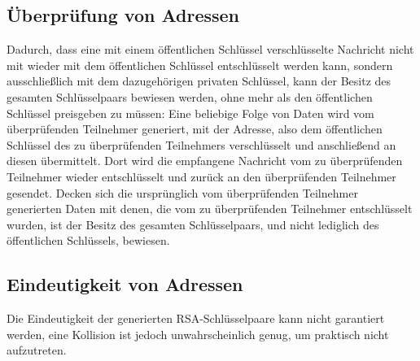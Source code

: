 \subsection{Überprüfung von Adressen}
Dadurch, dass eine mit einem öffentlichen Schlüssel verschlüsselte Nachricht nicht mit wieder mit dem
öffentlichen Schlüssel entschlüsselt werden kann, sondern ausschließlich mit dem dazugehörigen privaten
Schlüssel, kann der Besitz des gesamten Schlüsselpaars bewiesen werden, ohne mehr als den öffentlichen
Schlüssel preisgeben zu müssen: Eine beliebige Folge von Daten wird vom überprüfenden Teilnehmer
generiert, mit der Adresse, also dem öffentlichen Schlüssel des zu überprüfenden Teilnehmers
verschlüsselt und anschließend an diesen übermittelt. Dort wird die empfangene Nachricht vom zu
überprüfenden Teilnehmer wieder entschlüsselt und zurück an den überprüfenden Teilnehmer gesendet.
Decken sich die ursprünglich vom überprüfenden Teilnehmer generierten Daten mit denen, die vom zu
überprüfenden Teilnehmer entschlüsselt wurden, ist der Besitz des gesamten Schlüsselpaars, und nicht
lediglich des öffentlichen Schlüssels, bewiesen.



\subsection{Eindeutigkeit von Adressen}
Die Eindeutigkeit der generierten RSA-Schlüsselpaare kann nicht garantiert werden, eine Kollision ist jedoch unwahrscheinlich genug, um praktisch nicht aufzutreten. \cite{crypto.stackexchange.com/a/2559:rsa-key-collision}

